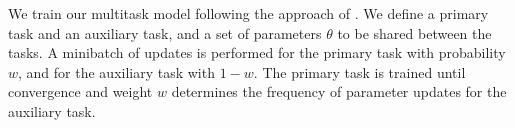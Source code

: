We train our multitask model following the approach of \citep{Luong2016}. We define a primary task and an auxiliary task, and a set of parameters $\theta$ to be shared between the tasks. A minibatch of updates is performed for the primary task with probability $w$, and for the auxiliary task with $1-w$. The primary task is trained until convergence and weight $w$ 
determines the frequency of parameter updates for the auxiliary task.
